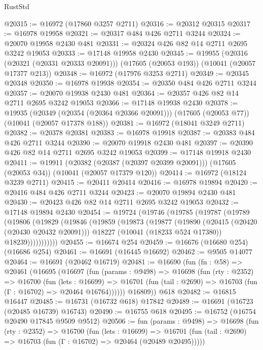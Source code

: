 \begin{lexlean}{RustStd}
\begin{coremodule}
@20315 := @16972 (@17860 @3257 @2711)
@20316 := @20312 @20315
@20317 := @16978 @19958
@20321 := @20317 @484 @426 @2711 @3244
@20324 := @20070 @19958 @2430 @481
@20331 := @20324 @426 @82 @14 @2711 @2695 @3242 @19053
@20333 := @17148 @19958 @2430
@20345 := @19955
    (@20316 (@20321 (@20331 @20333 @20091)))
    (@17605 (@20053 @193))
    (@10041 (@20057 @17377 @213))
@20348 := @16972 (@17976 @3253 @2711)
@20349 := @20345 @20348
@20350 := @16978 @19938
@20354 := @20350 @484 @426 @2711 @3244
@20357 := @20070 @19938 @2430 @481
@20364 := @20357 @426 @82 @14 @2711 @2695 @3242 @19053
@20366 := @17148 @19938 @2430
@20378 := @19935
    (@20349 (@20354 (@20364 @20366 @20091)))
    (@17605 (@20053 @77))
    (@10041 (@20057 @17378 @188))
@20381 := @16972 (@18041 @3249 @2711)
@20382 := @20378 @20381
@20383 := @16978 @19918
@20387 := @20383 @484 @426 @2711 @3244
@20390 := @20070 @19918 @2430 @481
@20397 := @20390 @426 @82 @14 @2711 @2695 @3242 @19053
@20399 := @17148 @19918 @2430
@20411 := @19911
    (@20382 (@20387 (@20397 @20399 @20091)))
    (@17605 (@20053 @34))
    (@10041 (@20057 @17379 @120))
@20414 := @16972 (@18124 @3239 @2711)
@20415 := @20411 @20414
@20416 := @16978 @19894
@20420 := @20416 @484 @426 @2711 @3244
@20423 := @20070 @19894 @2430 @481
@20430 := @20423 @426 @82 @14 @2711 @2695 @3242 @19053
@20432 := @17148 @19894 @2430
@20454 := @19724
    (@19746
      (@19785
        (@19787
          (@19789
            (@19806
              (@19829
                (@19846
                  (@19859
                    (@19873
                      (@19877
                        (@19890
                          (@20415 (@20420 (@20430 @20432 @20091)))
                          @18227
                          (@10041 (@18233 @524 @17380))
                          @18239)))))))))))
@20455 := @16674 @254
@20459 := @16676 (@16680 @254) (@16686 @254)
@20461 := @16691 (@16445 @16692)
@20462 := @9505 @14077
@20464 := @16691 (@20462 @16719)
@20481 := @16690
    (fun (fn : @58) =>
    @20461
      (@16695
        (@16697
          (fun (params : @9498) =>
          @16698
            (fun (rty : @2352) =>
            @16700
              (fun (lets : @16699) =>
              @16701 (fun (tail : @2690) => @16703 (fun (Γ : @16702) => @20464 @16764))))))
        @16809))
    @618
@20482 := @16815 @16447
@20485 := @16731 (@16732 @618) @17842
@20489 := @16691 (@16723 (@20485 @16739) @16743)
@20490 := @16755 @618
@20495 := @16752 (@16754 @20490 @17845 @9509 @9512)
@20506 := fun (params : @9498) =>
  @16698
    (fun (rty : @2352) =>
    @16700
      (fun (lets : @16699) =>
      @16701 (fun (tail : @2690) => @16703 (fun (Γ : @16702) => @20464 (@20489 @20495)))))

\end{coremodule}
\end{lexlean}
